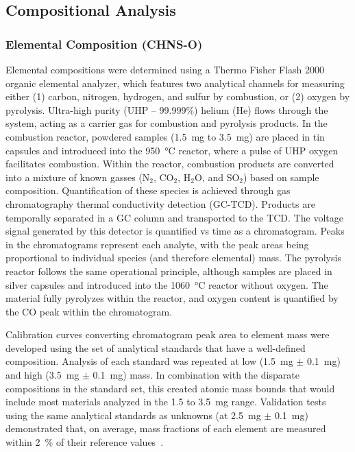 \documentclass{book}
\begin{document}
\subsection{Compositional Analysis}
\label{g_tests_composition}
\subsubsection{Elemental Composition (CHNS-O)}
Elemental compositions were determined using a Thermo Fisher Flash 2000 organic elemental analyzer, which features two analytical channels for measuring either (1) carbon, nitrogen, hydrogen, and sulfur by combustion, or (2) oxygen by pyrolysis. Ultra-high purity (UHP – 99.999\%) helium (He) flows through the system, acting as a carrier gas for combustion and pyrolysis products. In the combustion reactor, powdered samples (1.5~mg to 3.5~mg) are placed in tin capsules and introduced into the 950~°C reactor, where a pulse of UHP oxygen facilitates combustion. Within the reactor, combustion products are converted into a mixture of known gasses (N$_{2}$, CO$_{2}$, H$_{2}$O, and SO$_{2}$) based on sample composition. Quantification of these species is achieved through gas chromatography thermal conductivity detection (GC-TCD). Products are temporally separated in a GC column and transported to the TCD. The voltage signal generated by this detector is quantified vs time as a chromatogram.  Peaks in the chromatograms represent each analyte, with the peak areas being proportional to individual species (and therefore elemental) mass. The pyrolysis reactor follows the same operational principle, although samples are placed in silver capsules and introduced into the 1060~°C reactor without oxygen. The material fully pyrolyzes within the reactor, and oxygen content is quantified by the CO peak within the chromatogram.

Calibration curves converting chromatogram peak area to element mass were developed using the set of analytical standards that have a well-defined composition. Analysis of each standard was repeated at low (1.5~mg $\pm$ 0.1~mg) and high (3.5~mg $\pm$ 0.1~mg) mass. In combination with the disparate compositions in the standard set, this created atomic mass bounds that would include most materials analyzed in the 1.5 to 3.5~mg range. Validation tests using the same analytical standards as unknowns (at 2.5~mg $\pm$ 0.1~mg) demonstrated that, on average, mass fractions of each element are measured within 2~\% of their reference values~\cite{tripi2025measurement}.
\end{document}
